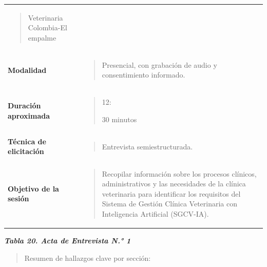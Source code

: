 \documentclass[
]{article}
\begin{document}
{\begin{longtable}[]{@{}
  >{\raggedright\arraybackslash}p{}
  >{\raggedright\arraybackslash}p{}@{}}
\begin{minipage}[t]{\linewidth}
\begin{quote}
Veterinaria Colombia-El empalme
\end{quote}
\end{minipage} \\
\textbf{Modalidad} & \begin{minipage}[t]{\linewidth}\raggedright
\begin{quote}
Presencial, con grabación de audio y consentimiento informado.
\end{quote}
\end{minipage} \\
\textbf{Duración aproximada} &
\begin{minipage}[t]{\linewidth}\raggedright
\begin{quote}
12:

30 minutos
\end{quote}
\end{minipage} \\
\textbf{Técnica de elicitación} &
\begin{minipage}[t]{\linewidth}\raggedright
\begin{quote}
Entrevista semiestructurada.
\end{quote}
\end{minipage} \\
\textbf{Objetivo de la sesión} &
\begin{minipage}[t]{\linewidth}\raggedright
\begin{quote}
Recopilar información sobre los procesos clínicos, administrativos y las
necesidades de la clínica veterinaria para identificar los requisitos
del Sistema de Gestión Clínica Veterinaria con Inteligencia Artificial
(SGCV-IA).
\end{quote}
\end{minipage} \\
\end{longtable}
}

\protect{}\label{_bookmark79}{}\emph{\textbf{Tabla 20. Acta
de Entrevista N.° 1}}

\begin{quote}
Resumen de hallazgos clave por sección:
\end{quote}
\end{document}
